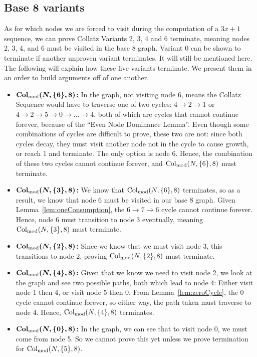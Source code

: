 \subsection{Base 8 variants} \label{subsubsec:base8subprob}
As for which nodes we are forced to visit during the computation of a $3x+1$ sequence, we can prove Collatz Variants 2, 3, 4 and 6 terminate, meaning nodes 2, 3, 4, and 6 must be visited in the base 8 graph. Variant 0 can be shown to terminate if another unproven variant terminates. It will still be mentioned here. The following will explain how these five variants terminate. We present them in an order to build arguments off of one another.
\begin{itemize}
    \item \textbf{$\boldsymbol{\mathrm{Col}_{\text{mod}}(N,\{6\},8)}$:} In the graph, not visiting node $6$, means the Collatz Sequence would have to traverse one of two cycles: $4 \rightarrow 2 \rightarrow 1$ or $4 \rightarrow 2 \rightarrow 5 \rightarrow 0 \rightarrow \ldots \rightarrow 4$, both of which are cycles that cannot continue forever, because of the ``Even Node Dominance Lemma''. Even though some combinations of cycles are difficult to prove, these two are not: since both cycles decay, they must visit another node not in the cycle to cause growth, or reach 1 and terminate. The only option is node 6. Hence, the combination of these two cycles cannot continue forever, and $\mathrm{Col}_{\text{mod}}(N,\{6\},8)$ must terminate.
    \item \textbf{$\boldsymbol{\mathrm{Col}_{\text{mod}}(N,\{3\},8)}$:} We know that $\mathrm{Col}_{\text{mod}}(N,\{6\},8)$ terminates, so as a result, we know that node 6 must be visited in our base 8 graph.  Given Lemma~\ref{lem:oneConsumption}, the $6 \rightarrow 7 \rightarrow 6$ cycle cannot continue forever. Hence, node 6 must transition to node 3 eventually, meaning $\mathrm{Col}_{\text{mod}}(N,\{3\},8)$ must terminate.
    \item \textbf{$\boldsymbol{\mathrm{Col}_{\text{mod}}(N,\{2\},8)}$:} Since we know that we must visit node 3, this transitions to node 2, proving $\mathrm{Col}_{\text{mod}}(N,\{2\},8)$ must terminate.
    \item \textbf{$\boldsymbol{\mathrm{Col}_{\text{mod}}(N,\{4\},8)}$:} Given that we know we need to visit node 2, we look at the graph and see two possible paths, both which lead to node 4: Either visit node 1 then 4, or visit node 5 then 0. From Lemma~\ref{lem:zeroCycle}, the 0 cycle cannot continue forever, so either way, the path taken must traverse to node 4. Hence, $\mathrm{Col}_{\text{mod}}(N,\{4\},8)$ terminates.
    \item \textbf{$\boldsymbol{\mathrm{Col}_{\text{mod}}(N,\{0\},8)}$:} In the graph, we can see that to visit node 0, we must come from node 5. So we cannot prove this yet unless we prove termination for $\mathrm{Col}_{\text{mod}}(N,\{5\},8)$.
\end{itemize}
